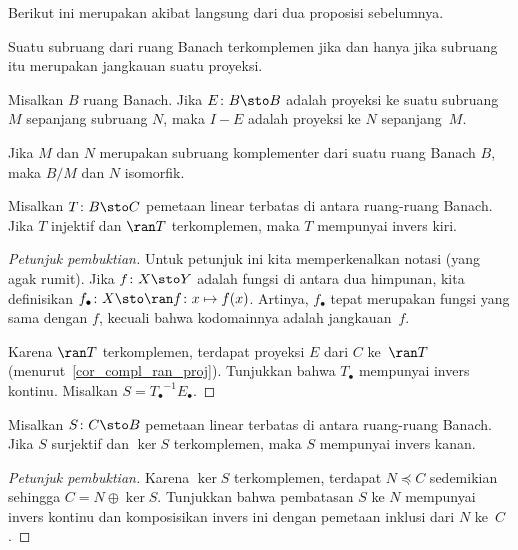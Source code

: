 Berikut ini merupakan akibat langsung dari dua proposisi sebelumnya.

\begin{cor}\label{cor_compl_ran_proj} Suatu subruang dari ruang Banach terkomplemen jika dan hanya jika subruang itu
merupakan jangkauan suatu proyeksi.
\end{cor}

\begin{prop} Misalkan $B$ ruang Banach. Jika $E \colon B \sto B$ adalah proyeksi ke suatu subruang
$M$ sepanjang subruang $N$, maka $I - E$ adalah proyeksi ke $N$ sepanjang~$M$.
\end{prop}

\begin{prop}\label{C069824} Jika $M$ dan $N$ merupakan subruang komplementer dari suatu ruang Banach $B$, maka $B/M$ dan
$N$ isomorfik.
\end{prop}

\begin{prop}\label{prop_linv_Bsp} Misalkan $T \colon B \sto C$ pemetaan linear terbatas di antara ruang-ruang Banach.
Jika $T$ injektif dan $\ran T$ terkomplemen, maka $T$ mempunyai invers kiri.
\end{prop}

\begin{proof}[\emph{Petunjuk pembuktian}] Untuk petunjuk ini kita memperkenalkan notasi (yang agak rumit).
Jika $f\colon X \sto Y$ adalah fungsi di antara dua himpunan, kita definisikan
$f_\bullet \colon X \sto \ran f\colon x \mapsto f(x)$. Artinya, $f_\bullet$ tepat merupakan fungsi yang sama
dengan $f$, kecuali bahwa kodomainnya adalah jangkauan~$f$.

Karena $\ran T$ terkomplemen, terdapat proyeksi $E$ dari $C$ ke~$\ran T$
(menurut~\ref{cor_compl_ran_proj}). Tunjukkan bahwa $T_\bullet$ mempunyai invers kontinu.
Misalkan $S = {T_\bullet}^{-1}E_\bullet$.    \ns
\end{proof}

\begin{prop}\label{prop_rinv_Bsp} Misalkan $S \colon C \sto B$ pemetaan linear terbatas di antara ruang-ruang Banach.
Jika $S$ surjektif dan $\ker S$ terkomplemen, maka $S$ mempunyai invers kanan.
\end{prop}

\begin{proof}[\emph{Petunjuk pembuktian}] Karena $\ker S$ terkomplemen, terdapat $N \preccurlyeq C$ sedemikian sehingga
$C = N \oplus \ker S$. Tunjukkan bahwa pembatasan $S$ ke $N$ mempunyai invers kontinu dan komposisikan
invers ini dengan pemetaan inklusi dari $N$ ke~$C$.   \ns
\end{proof}

